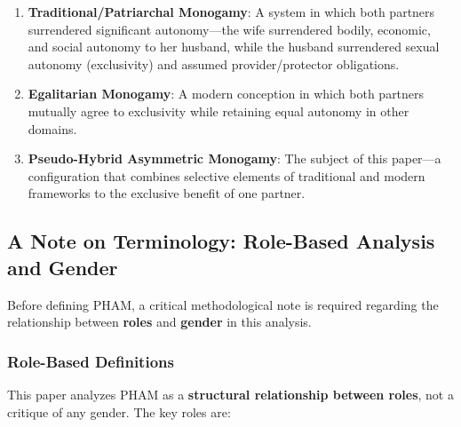 \documentclass[12pt, letterpaper]{article}
\begin{document}
\begin{enumerate}[label=(\alph*)]
    \item \textbf{Traditional/Patriarchal Monogamy}: A system in which both partners surrendered significant autonomy---the wife surrendered bodily, economic, and social autonomy to her husband, while the husband surrendered sexual autonomy (exclusivity) and assumed provider/protector obligations.
    \item \textbf{Egalitarian Monogamy}: A modern conception in which both partners mutually agree to exclusivity while retaining equal autonomy in other domains.
    \item \textbf{Pseudo-Hybrid Asymmetric Monogamy}: The subject of this paper---a configuration that combines selective elements of traditional and modern frameworks to the exclusive benefit of one partner.
\end{enumerate}

\subsection{A Note on Terminology: Role-Based Analysis and Gender}

Before defining PHAM, a critical methodological note is required regarding the relationship between \textbf{roles} and \textbf{gender} in this analysis.

\subsubsection{Role-Based Definitions}

This paper analyzes PHAM as a \textbf{structural relationship between roles}, not a critique of any gender. The key roles are:
\end{document}
